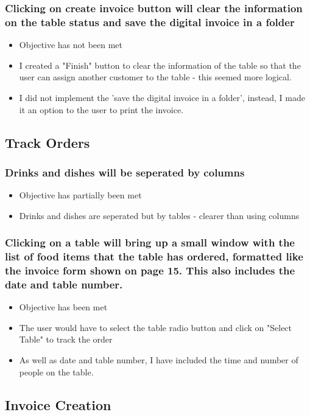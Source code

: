 \subsubsection{ Clicking on create invoice button will clear the information on the table status and save the digital invoice in a folder}
\begin{itemize}
	\item Objective has not been met
	\item I created a "Finish" button to clear the information of the table so that the user can assign another customer to the table - this seemed more logical.
	\item I did not implement the 'save the digital invoice in a folder', instead, I made it an option to the user to print the invoice.
\end{itemize}

\subsection{Track Orders}

\subsubsection{ Drinks and dishes will be seperated by columns }
\begin{itemize}
	\item Objective has partially been met
	\item Drinks and dishes are seperated but by tables - clearer than using columns
\end{itemize}

\subsubsection{Clicking on a table will bring up a small window with the list of food items that the table has ordered, formatted like the invoice form shown on page 15. This also includes the date and table number.}
\begin{itemize}
	\item Objective has been met
	\item The user would have to select the table radio button and click on "Select Table" to track the order 
	\item As well as date and table number, I have included the time and number of people on the table.
\end{itemize}

\subsection{Invoice Creation}

